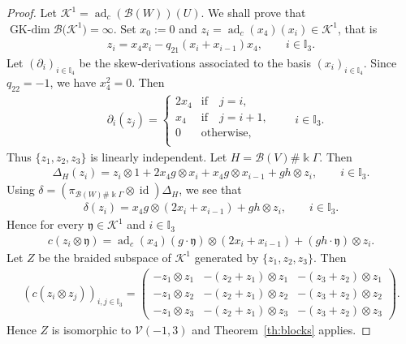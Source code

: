 \documentclass[10pt,a4paper]{amsart}
\numberwithin{equation}{section}
\newcommand{\adc}{\operatorname{ad}_c}
\newcommand{\GK}{\operatorname{GK-dim}}
\newcommand{\id}{\operatorname{id}}
\newcommand{\toba}{\mathscr B}
\newcommand{\K}{{\mathcal{K}}}
\newcommand{\I}{{\mathbb I}}
\begin{document}
\begin{proof} Let $\K^1 =\adc(\toba(W))(U)$. We shall prove that $\GK \toba\big(\K^1\big) = \infty$.
Set $x_0 := 0$ and $z_{i} =\adc(x_{4})(x_i) \in \K^1$, that is
\begin{align}\label{eq:zi-largeblock-point}
z_{i} = x_{4}x_i - q_{21}(x_i + x_{i-1})x_{4},\qquad i \in \I_{3}.
\end{align}
Let $(\partial_i)_{i \in \I_{4}}$ be the skew-derivations associated to the basis
$(x_i)_{i \in \I_{4}}$.
Since $q_{22} = -1$, we have $x_4^2 = 0$. Then
\begin{align*}
&\partial_i(z_{j}) =
\begin{cases}
2x_{4} & \mbox{if}\quad j = i, \\
x_{4} & \mbox{if}\quad j = i + 1, \\
0 & \text{otherwise,}\\
\end{cases}\qquad i \in \I_3.
\end{align*}
Thus $\{z_{1}, z_{2}, z_{3}\}$ is linearly independent.
Let $H = \toba(V)\# \Bbbk \Gamma$. Then
\begin{align*}
\Delta_{H}(z_{i}) = z_{i} \otimes 1 + 2x_{4} g \otimes x_i + x_{4} g \otimes x_{i-1} + gh \otimes z_{i},
\qquad i \in \I_3.
\end{align*}
Using $\delta =(\pi _{\toba (W)\# \Bbbk \Gamma}\otimes \id)\Delta _{H}$, we see that
\begin{align*}
\delta(z_{i}) = x_{4} g \otimes (2x_i + x_{i-1}) + gh \otimes z_{i},\qquad
 i \in \I_3.
\end{align*}
Hence for every $\mathfrak{y} \in \K^1$ and $i \in \I_3$
\begin{align*}
c(z_{i}\otimes \mathfrak{y}) = \adc(x_{4})(g \cdot \mathfrak{y}) \otimes (2x_i + x_{i-1})
+ (gh\cdot \mathfrak{y}) \otimes z_{i}.
\end{align*}
Let $Z$ be the braided subspace of $\K^1$ generated by $\big\{z_{1}, z_{2}, z_{3} \big\}$.
Then
\begin{align*}
(c(z_i \otimes z_j))_{i,j\in \I_3} =
\begin{pmatrix}
-z_{1} \otimes z_{1} & -(z_{2} + z_{1}) \otimes z_{1} & -(z_{3} + z_{2}) \otimes z_{1} \\
-z_{1} \otimes z_{2} & -(z_{2} + z_{1}) \otimes z_{2} & -(z_{3} + z_{2}) \otimes z_{2} \\
-z_{1} \otimes z_{3} & -(z_{2} + z_{1}) \otimes z_{3} & -(z_{3} + z_{2}) \otimes z_{3}
\end{pmatrix}\!.
\end{align*}
Hence $Z$ is isomorphic to $\mathcal{V}(-1, 3)$
and Theorem~\ref{th:blocks} applies.
\end{proof}
\end{document}
